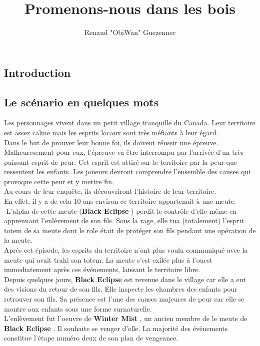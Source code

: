 \documentclass[oneside,12pt]{book}
\title{Promenons-nous dans les bois}
\author{Renaud "ObiWan" Guezennec}
\date{}
\newcommand{\BlackEclipse}{\textbf{Black Eclipse} }
\newcommand{\Winter}{\textbf{Winter Mist} }
\begin{document}
\maketitle \clearpage
\tableofcontents \clearpage
\listoffigures \clearpage

\begin{flushleft}
    \chapter{Introduction}
    \section{Le scénario en quelques mots}
Les personnages vivent dans un petit village tranquille du Canada. Leur territoire est assez calme mais les esprits locaux sont très méfiants à leur égard. \\
Dans le but de prouver leur bonne foi, ils doivent réussir une épreuve. Malheuresement pour eux, l'épreuve va être interrompu par l'arrivée d'un très puissant esprit de peur. 
Cet esprit est attiré sur le territoire par la peur que ressentent les enfants. 
Les joueurs devront comprendre l'ensemble des causes qui provoque cette peur et y mettre fin.\\
Au cours de leur enquête, ils découvriront l'histoire de leur territoire. \\
En effet, il y a de cela 10 ans environ ce territoire appartenait à une meute.\\
-L'alpha de cette meute (\BlackEclipse) perdit le contrôle d'elle-même en apprennant l'enlèvement de son fils. 
Sous la rage, elle tua (totalement) l'esprit totem de sa meute dont le role était de protéger son fils pendant une opération de la meute.\\ 
Après cet épisode, les esprits du territoire n'ont plus voulu communiqué avec la meute qui avait trahi son totem. 
La meute s'est exilée plus à l'ouest immediatement après ces événements, laissant le territoire libre.\\ 
Depuis quelques jours, \BlackEclipse est revenue dans le village car elle a eut des visions du retour de son fils. 
Elle inspecte les chambres des enfants pour retrouver son fils. Sa présence est l'une des causes majeures de peur car elle se montre aux enfants sous une forme surnaturelle.\\
L'enlèvement fut l'oeuvre de \Winter , un ancien membre de le meute de \BlackEclipse. Il souhaite se venger d'elle. La majorité des événements constitue l'étape numéro deux de son plan de vengeance. 

\end{flushleft}
\end{document}
